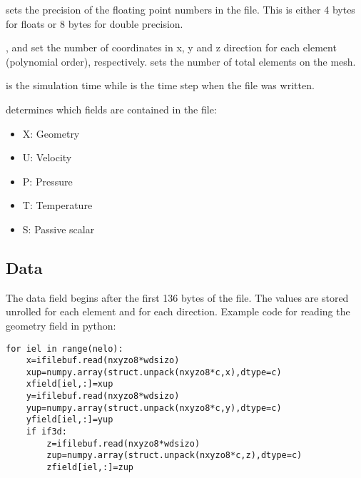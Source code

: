 \begin{center}
\end{center}

 sets the precision of the floating point numbers in the file. This
is either 4 bytes for floats or 8 bytes for double precision.

,  and  set the number of coordinates in  x, y and z
direction for each element (polynomial order), respectively.  sets
the number of total elements on the mesh.

 is the simulation time while  is the time step when the file was written.

 determines which fields are contained in the file:
\begin{itemize}
  \item X: Geometry
  \item U: Velocity
  \item P: Pressure
  \item T: Temperature
  \item S: Passive scalar
\end{itemize}

\subsection{Data}
The data field begins after the first 136 bytes of the file. The values are
stored unrolled for each element and for each direction.
Example code for reading the geometry field in python:
\begin{lstlisting}
for iel in range(nelo):
    x=ifilebuf.read(nxyzo8*wdsizo)
    xup=numpy.array(struct.unpack(nxyzo8*c,x),dtype=c)
    xfield[iel,:]=xup
    y=ifilebuf.read(nxyzo8*wdsizo)
    yup=numpy.array(struct.unpack(nxyzo8*c,y),dtype=c)
    yfield[iel,:]=yup
    if if3d:
        z=ifilebuf.read(nxyzo8*wdsizo)
        zup=numpy.array(struct.unpack(nxyzo8*c,z),dtype=c)    
        zfield[iel,:]=zup
\end{lstlisting}

